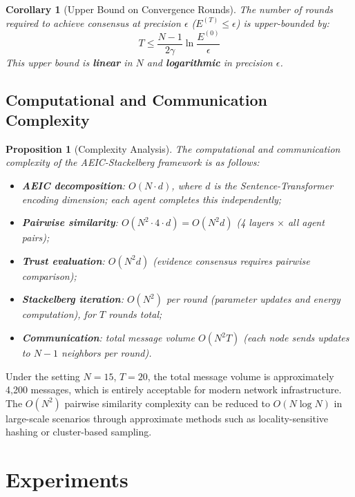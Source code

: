 \documentclass[12pt,a4paper]{article}
\newtheorem{proposition}{Proposition}[section]
\newtheorem{corollary}{Corollary}[section]
\begin{document}
\begin{corollary}[Upper Bound on Convergence Rounds]
The number of rounds required to achieve consensus at precision $\epsilon$ ($E^{(T)} \leq \epsilon$) is upper-bounded by:
\begin{equation}
T \leq \frac{N-1}{2\gamma} \ln\frac{E^{(0)}}{\epsilon}
\end{equation}
This upper bound is \textbf{linear} in $N$ and \textbf{logarithmic} in precision $\epsilon$.
\end{corollary}

\subsection{Computational and Communication Complexity}

\begin{proposition}[Complexity Analysis]\label{prop:complexity}
The computational and communication complexity of the AEIC-Stackelberg framework is as follows:
\begin{itemize}[nosep]
    \item \textbf{AEIC decomposition}: $O(N \cdot d)$, where $d$ is the Sentence-Transformer encoding dimension; each agent completes this independently;
    \item \textbf{Pairwise similarity}: $O(N^2 \cdot 4 \cdot d) = O(N^2 d)$ (4 layers $\times$ all agent pairs);
    \item \textbf{Trust evaluation}: $O(N^2 d)$ (evidence consensus requires pairwise comparison);
    \item \textbf{Stackelberg iteration}: $O(N^2)$ per round (parameter updates and energy computation), for $T$ rounds total;
    \item \textbf{Communication}: total message volume $O(N^2 T)$ (each node sends updates to $N-1$ neighbors per round).
\end{itemize}
\end{proposition}

Under the setting $N = 15$, $T = 20$, the total message volume is approximately 4,200 messages, which is entirely acceptable for modern network infrastructure. The $O(N^2)$ pairwise similarity complexity can be reduced to $O(N \log N)$ in large-scale scenarios through approximate methods such as locality-sensitive hashing or cluster-based sampling.

\section{Experiments}\label{sec:experiments}
\end{document}
